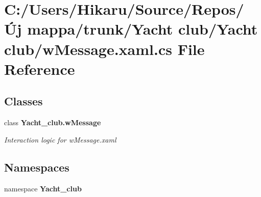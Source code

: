 \section{C\+:/\+Users/\+Hikaru/\+Source/\+Repos/Új mappa/trunk/\+Yacht club/\+Yacht club/w\+Message.xaml.\+cs File Reference}
\label{w_message_8xaml_8cs}
\subsection*{Classes}
\begin{DoxyCompactItemize}
\item 
class \textbf{ Yacht\+\_\+club.\+w\+Message}
\begin{DoxyCompactList}\small\item\em Interaction logic for w\+Message.\+xaml \end{DoxyCompactList}\end{DoxyCompactItemize}
\subsection*{Namespaces}
\begin{DoxyCompactItemize}
\item 
namespace \textbf{ Yacht\+\_\+club}
\end{DoxyCompactItemize}

